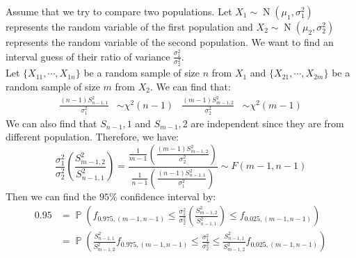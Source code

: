 \documentclass{huhtakm-template-book-v2}
\DeclareMathOperator{\prob}{\mathbb{P}}
\DeclareMathOperator{\N}{N}
\begin{document}
\newpage
\begin{eg}
	Assume that we try to compare two populations. Let $X_{1}\sim\N(\mu_{1},\sigma_{1}^{2})$ represents the random variable of the first population and $X_{2}\sim\N(\mu_{2},\sigma_{2}^{2})$ represents the random variable of the second population. We want to find an interval guess of their ratio of variance $\frac{\sigma_{1}^{2}}{\sigma_{2}^{2}}$.\\
	Let $\{X_{11},\cdots,X_{1n}\}$ be a random sample of size $n$ from $X_{1}$ and $\{X_{21},\cdots,X_{2m}\}$ be a random sample of size $m$ from $X_{2}$. We can find that:
	\begin{align*}
		\frac{(n-1)S_{n-1,1}^{2}}{\sigma_{1}^{2}}&\sim\chi^{2}(n-1) & \frac{(m-1)S_{m-1,2}^{2}}{\sigma_{2}^{2}}&\sim\chi^{2}(m-1)
	\end{align*}
	We can also find that $S_{n-1},1$ and $S_{m-1},2$ are independent since they are from different population. Therefore, we have:
	\begin{equation*}
		\frac{\sigma_{1}^{2}}{\sigma_{2}^{2}}\left(\frac{S_{m-1,2}^{2}}{S_{n-1,1}^{2}}\right)=\frac{\frac{1}{m-1}\left(\frac{(m-1)S_{m-1,2}^{2}}{\sigma_{2}^{2}}\right)}{\frac{1}{n-1}\left(\frac{(n-1)S_{n-1,1}^{2}}{\sigma_{1}^{2}}\right)}\sim F(m-1,n-1)
	\end{equation*}
	Then we can find the $95\%$ confidence interval by:
	\begin{align*}
		0.95&=\prob\left(f_{0.975,(m-1,n-1)}\leq\frac{\sigma_{1}^{2}}{\sigma_{2}^{2}}\left(\frac{S_{m-1,2}^{2}}{S_{n-1,1}^{2}}\right)\leq f_{0.025,(m-1,n-1)}\right)\\
		&=\prob\left(\frac{S_{n-1,1}^{2}}{S_{m-1,2}^{2}}f_{0.975,(m-1,n-1)}\leq\frac{\sigma_{1}^{2}}{\sigma_{2}^{2}}\leq \frac{S_{n-1,1}^{2}}{S_{m-1,2}^{2}}f_{0.025,(m-1,n-1)}\right)
	\end{align*}
\end{eg}
\end{document}
